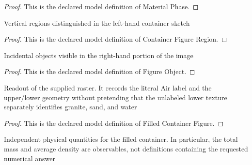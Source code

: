 \begin{proof}
  This is the declared model definition of Material Phase.
\end{proof}
\begin{definition}
  \label{def:physics:phyx-mini-0380:phyxminiproblems-problemphyxmini0380-containerfigureregion}
  Vertical regions distinguished in the left-hand container sketch
\end{definition}
\begin{proof}
  This is the declared model definition of Container Figure Region.
\end{proof}
\begin{definition}
  \label{def:physics:phyx-mini-0380:phyxminiproblems-problemphyxmini0380-figureobject}
  Incidental objects visible in the right-hand portion of the image
\end{definition}
\begin{proof}
  This is the declared model definition of Figure Object.
\end{proof}
\begin{definition}
  \label{def:physics:phyx-mini-0380:phyxminiproblems-problemphyxmini0380-filledcontainerfigure}
  Readout of the supplied raster. It records the literal Air label and the upper/lower geometry without pretending that the unlabeled lower texture separately identifies granite, sand, and water
\end{definition}
\begin{proof}
  This is the declared model definition of Filled Container Figure.
\end{proof}
\begin{definition}
  \label{def:physics:phyx-mini-0380:phyxminiproblems-problemphyxmini0380-filledcontainersetup}
  Independent physical quantities for the filled container. In particular, the total mass and average density are observables, not definitions containing the requested numerical answer
\end{definition}
